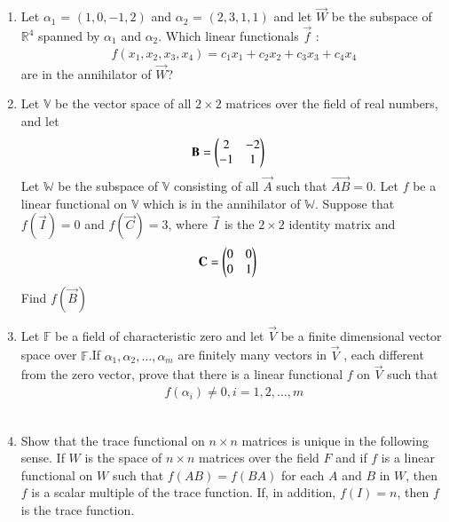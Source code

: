 \begin{enumerate}[label=\thesubsection.\arabic*.,ref=\thesubsection.\theenumi]
%
\\
\solution

\item Let $\alpha_1$ = $(1, 0,-1, 2)$ and $\alpha_2$ = $(2,3, 1,1)$ and let $\vec{W}$ be the subspace of $\mathbb{R}^4$ spanned by $\alpha_1$ and $\alpha_2$. Which linear functionals $\vec{f}$ :
\begin{align}
f(x_1,x_2,x_3,x_4) = c_1x_1 + c_2x_2 + c_3x_3 + c_4x_4 \label{eq:solutions/3/5/7/3} 
\end{align}
are in the annihilator of $\vec{W}$?
%
\\
\solution

\item Let $\mathbb{V}$ be the vector space of all $2 \times 2$ matrices over the field of real numbers, and let
\begin{align}
\mathbf{B} &= \begin{pmatrix}2&-2\\-1&1\end{pmatrix}
\end{align}
Let $\mathbb{W}$ be the subspace of $\mathbb{V}$ consisting of all $\vec{A}$ such that $\vec{AB} = 0$. Let $f$ be a linear functional on $\mathbb{V}$ which is in the annihilator of $\mathbb{W}$. Suppose that $f(\vec{I}) = 0$ and $f(\vec{C}) = 3$, where $\vec{I}$ is the $2 \times 2$ identity matrix and
\begin{align}
\mathbf{C} &= \begin{pmatrix}0&0\\0&1\end{pmatrix}
\end{align}
Find $f(\vec{B})$
%
\\
\solution

\item Let $\mathbb{F}$ be a field of characteristic zero and let $\vec{V}$ be a finite dimensional vector space over  $\mathbb{F}$.If $\alpha_1,\alpha_2,\hdots,\alpha_m$ are finitely many vectors in $\vec{V}$ , each different from the zero vector, prove that there is a linear functional $f$ on $\vec{V}$ such that
\begin{align}
    f(\alpha_i) \neq 0, i=1,2,\hdots,m
\end{align}
%
\\
\solution

\item Show that the trace functional on $n\times n$ matrices is unique in the following sense. If $W$ is the space of $n \times n$ matrices over the field $F$ and if $f$ is a linear functional on $W$ such that $f(AB) = f(BA)$ for each $A$ and $B$ in $W$, then $f$ is a scalar multiple of the trace function. If, in addition, $f(I)=n$, then $f$ is the trace function.
\\
\solution

\end{enumerate}
